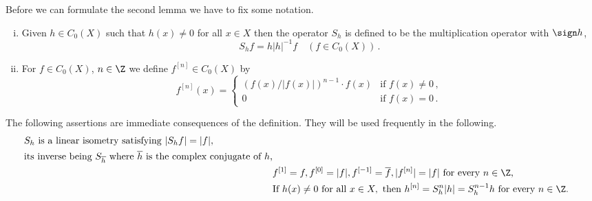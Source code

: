 Before we can formulate the second lemma we have to fix some notation.
	\begin{definition}\label{def:b3-2.2}
\begin{enumerate}[(i)]
		
\item
Given $h \in C_{0}(X)$ such that $h(x) \neq 0$ for all $x \in X$ then the operator $S_{h}$ is defined to be the multiplication operator with $ \sign h $, \ie
		\begin{equation}\label{eq:b3-2.3}
			S_{h}f = h|h|^{-1}f \quad (f \in C_{0}(X))\,.
		\end{equation}
		
\item
For $f \in C_{0}(X)$, $n \in \Z$ we define $f^{[n]} \in C_{0}(X)$ by
\begin{equation}\label{eq:b3-2.4}
	f^{[n]}(x) = 
	\begin{cases}
			(f(x)/|f(x)|)^{n-1}\cdot f(x) & \text{if } f(x) \neq 0\,,\\			
			0 & \text{if } f(x) = 0\,.
			\end{cases}
\end{equation}
\end{enumerate}
\end{definition}
The following assertions are immediate consequences of the definition. They will be used frequently in the following.
\begin{align}\label{eq:b3-2.6}
	\begin{split}
		&S_{h} \text{  is a linear isometry satisfying  } |S_{h}f| = |f|, \\ 
		&\text{its inverse being  } S_{\overline{h}} \text{  where  } \overline{h} \text{ is the complex conjugate of $ h $,}
	\end{split}\\
	&f^{[1]} = f, f^{[0]} = |f|, f^{[-1]} = \overline{f}, |f^{[n]}| = |f| \text{  for every $n \in \Z$, }\\ 
	&\text{If  } h(x) \neq 0 \text{  for all  } x \in X, \text{  then  } h^{[n]} = S_{h}^{n}|h| = S_{h}^{n-1}h
	\text{  for every $ n \in \Z $.} 
\end{align}
